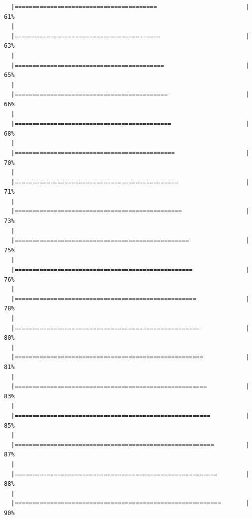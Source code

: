 \documentclass[]{book}
\begin{document}
\begin{verbatim}
  |========================================                         |  61%
  |                                                                       
  |=========================================                        |  63%
  |                                                                       
  |==========================================                       |  65%
  |                                                                       
  |===========================================                      |  66%
  |                                                                       
  |============================================                     |  68%
  |                                                                       
  |=============================================                    |  70%
  |                                                                       
  |==============================================                   |  71%
  |                                                                       
  |===============================================                  |  73%
  |                                                                       
  |=================================================                |  75%
  |                                                                       
  |==================================================               |  76%
  |                                                                       
  |===================================================              |  78%
  |                                                                       
  |====================================================             |  80%
  |                                                                       
  |=====================================================            |  81%
  |                                                                       
  |======================================================           |  83%
  |                                                                       
  |=======================================================          |  85%
  |                                                                       
  |========================================================         |  87%
  |                                                                       
  |=========================================================        |  88%
  |                                                                       
  |==========================================================       |  90%

\end{verbatim}
\end{document}
